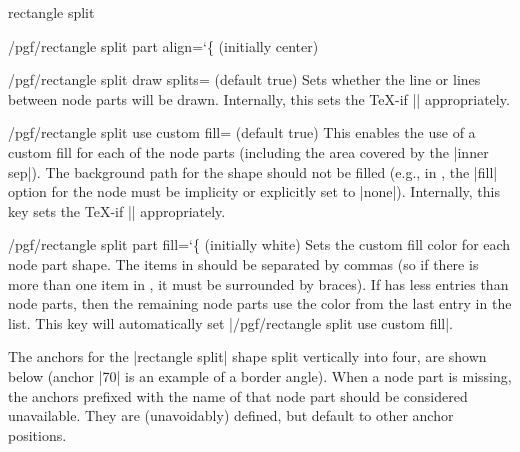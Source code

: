 \begin{shape}{rectangle split}
\begin{key}{/pgf/rectangle split part align={\ttfamily\char`\{} (initially center)}
  \end{key}

  \begin{key}{/pgf/rectangle split draw splits= (default true)}
  	Sets whether the line or lines between node parts will be drawn.
  	Internally, this sets the \TeX-if |\ifpgfrectanglesplitdrawsplits|
  	appropriately.
  \end{key}

  \begin{key}{/pgf/rectangle split use custom fill= (default true)}
    This enables the use of a custom fill for each of the node
    parts (including the area covered by the |inner sep|). The
    background path for the shape should not be filled (e.g., in
    \tikzname{}, the |fill|
    option for the node must be implicity or explicitly set to |none|).
    Internally, this key sets the \TeX-if
    |\ifpgfrectanglesplitusecustomfill| appropriately.
  \end{key}

  \begin{key}{/pgf/rectangle split part fill={\ttfamily\char`\{} (initially white)}
  	Sets the custom fill color for each node part shape.
  	The items in  should be separated by commas (so if
  	there is more than one item in , it must be surrounded
  	by braces).
  	If   has less entries than node
    parts, then the remaining node parts use the color from
    the last entry in the list. This key will automatically set
    |/pgf/rectangle split use custom fill|.

\begin{codeexample}[]
\end{codeexample}

\end{key}
	
  The anchors for the |rectangle split| shape split vertically into four,
  are shown below (anchor |70| is an example of a border angle). When a
  node part is missing, the anchors prefixed with the name of that node part
  should be considered unavailable. They are (unavoidably) defined, but
  default to other anchor positions.


\end{shape}
